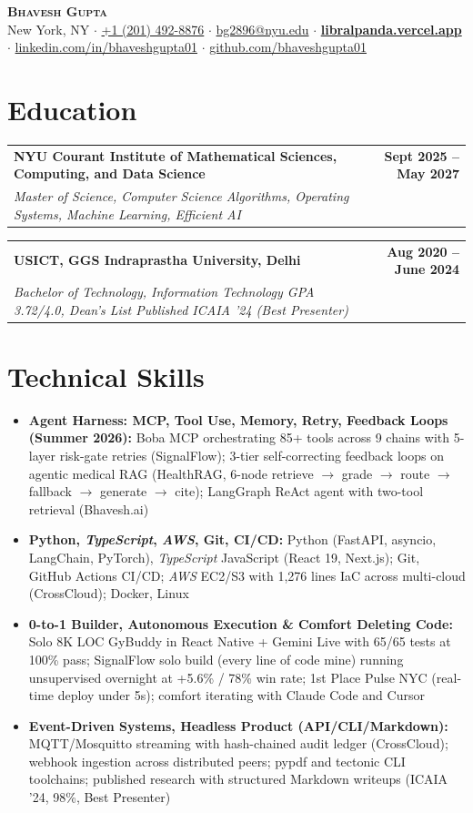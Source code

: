\documentclass[10pt, letterpaper]{article}
\makeatletter
\newcommand{\resumeEntry}[3]{\vspace{2pt}\noindent\begin{tabular*}{\textwidth}{@{}l@{\extracolsep{\fill}}r@{}}\textbf{\large #1} & \textbf{#3} \\\textit{#2} & \\\end{tabular*}}
\makeatother
\begin{document}
\begin{center}
\textbf{\Huge \scshape Bhavesh Gupta} \\ \vspace{2pt}
\small
New York, NY $\cdot$
\href{tel:+12014928876}{+1 (201) 492-8876} $\cdot$
\href{mailto:bg2896@nyu.edu}{bg2896@nyu.edu} $\cdot$
\href{https://libralpanda.vercel.app}{\textbf{libralpanda.vercel.app}} $\cdot$
\href{https://linkedin.com/in/bhaveshgupta01}{linkedin.com/in/bhaveshgupta01} $\cdot$
\href{https://github.com/bhaveshgupta01}{github.com/bhaveshgupta01}
\end{center}

\section{Education}
\resumeEntry{NYU Courant Institute of Mathematical Sciences, Computing, and Data Science}{Master of Science, Computer Science \textbar{} Algorithms, Operating Systems, Machine Learning, Efficient AI}{Sept 2025 -- May 2027}
\resumeEntry{USICT, GGS Indraprastha University, Delhi}{Bachelor of Technology, Information Technology \textbar{} GPA 3.72/4.0, Dean's List \textbar{} Published ICAIA '24 (Best Presenter)}{Aug 2020 -- June 2024}

\vspace{-6pt}
\section{Technical Skills}
\begin{itemize}
    \item \textbf{Agent Harness: MCP, Tool Use, Memory, Retry, Feedback Loops (Summer 2026):} Boba MCP orchestrating 85+ tools across 9 chains with 5-layer risk-gate retries (SignalFlow); 3-tier self-correcting feedback loops on agentic medical RAG (HealthRAG, 6-node retrieve $\to$ grade $\to$ route $\to$ fallback $\to$ generate $\to$ cite); LangGraph ReAct agent with two-tool retrieval (Bhavesh.ai)
    \item \textbf{Python, \textit{TypeScript}, \textit{AWS}, Git, CI/CD:} Python (FastAPI, asyncio, LangChain, PyTorch), \textit{TypeScript} JavaScript (React 19, Next.js); Git, GitHub Actions CI/CD; \textit{AWS} EC2/S3 with 1,276 lines IaC across multi-cloud (CrossCloud); Docker, Linux
    \item \textbf{0-to-1 Builder, Autonomous Execution \& Comfort Deleting Code:} Solo 8K LOC GyBuddy in React Native + Gemini Live with 65/65 tests at 100\% pass; SignalFlow solo build (every line of code mine) running unsupervised overnight at +5.6\% / 78\% win rate; 1st Place Pulse NYC (real-time deploy under 5s); comfort iterating with Claude Code and Cursor
    \item \textbf{Event-Driven Systems, Headless Product (API/CLI/Markdown):} MQTT/Mosquitto streaming with hash-chained audit ledger (CrossCloud); webhook ingestion across distributed peers; pypdf and tectonic CLI toolchains; published research with structured Markdown writeups (ICAIA '24, 98\%, Best Presenter)
\end{itemize}
\end{document}
